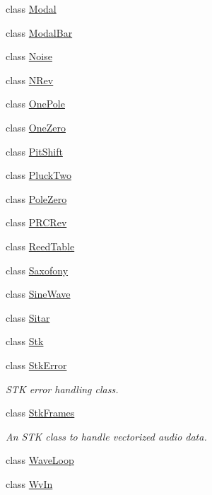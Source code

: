 \begin{DoxyCompactItemize}
\item 
class \hyperlink{class_nyq_1_1_modal}{Modal}
\item 
class \hyperlink{class_nyq_1_1_modal_bar}{Modal\+Bar}
\item 
class \hyperlink{class_nyq_1_1_noise}{Noise}
\item 
class \hyperlink{class_nyq_1_1_n_rev}{N\+Rev}
\item 
class \hyperlink{class_nyq_1_1_one_pole}{One\+Pole}
\item 
class \hyperlink{class_nyq_1_1_one_zero}{One\+Zero}
\item 
class \hyperlink{class_nyq_1_1_pit_shift}{Pit\+Shift}
\item 
class \hyperlink{class_nyq_1_1_pluck_two}{Pluck\+Two}
\item 
class \hyperlink{class_nyq_1_1_pole_zero}{Pole\+Zero}
\item 
class \hyperlink{class_nyq_1_1_p_r_c_rev}{P\+R\+C\+Rev}
\item 
class \hyperlink{class_nyq_1_1_reed_table}{Reed\+Table}
\item 
class \hyperlink{class_nyq_1_1_saxofony}{Saxofony}
\item 
class \hyperlink{class_nyq_1_1_sine_wave}{Sine\+Wave}
\item 
class \hyperlink{class_nyq_1_1_sitar}{Sitar}
\item 
class \hyperlink{class_nyq_1_1_stk}{Stk}
\item 
class \hyperlink{class_nyq_1_1_stk_error}{Stk\+Error}
\begin{DoxyCompactList}\small\item\em S\+TK error handling class. \end{DoxyCompactList}\item 
class \hyperlink{class_nyq_1_1_stk_frames}{Stk\+Frames}
\begin{DoxyCompactList}\small\item\em An S\+TK class to handle vectorized audio data. \end{DoxyCompactList}\item 
class \hyperlink{class_nyq_1_1_wave_loop}{Wave\+Loop}
\item 
class \hyperlink{class_nyq_1_1_wv_in}{Wv\+In}
\end{DoxyCompactItemize}
